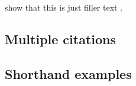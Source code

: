 \documentclass[a4paper]{article}
\begin{document}
\citeauthor{companion} show that this is just filler
text \autocite*{companion}.

\subsection*{Multiple citations}


\cite{knuth:ct:c,aristotle:physics,knuth:ct:b,aristotle:poetics,aristotle:rhetoric,knuth:ct:d}

\subsection*{Shorthand examples}


\cite{kant:kpv,kant:ku}

\clearpage


\printshorthands


\nocite{*}
\printbibliography
\end{document}
